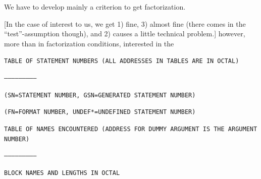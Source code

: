 We have to develop mainly a criterion to get factorization.

[In the case of interest to us, we get 1) fine, 3) almost fine (there comes in the ``test''-assumption though), and 2) causes a little technical problem.]  however, more than in factorization conditions, interested in the




\texttt{TABLE OF STATEMENT NUMBERS (ALL ADDRESSES IN TABLES ARE IN OCTAL)}

\texttt{--------------------------}


\texttt{(SN=STATEMENT NUMBER, GSN=GENERATED STATEMENT NUMBER)}

\texttt{(FN=FORMAT NUMBER, UNDEF*=UNDEFINED STATEMENT NUMBER)}

\texttt{TABLE OF NAMES ENCOUNTERED (ADDRESS FOR DUMMY ARGUMENT IS THE ARGUMENT NUMBER)}

\texttt{--------------------------}


\texttt{BLOCK NAMES AND LENGTHS IN OCTAL}



